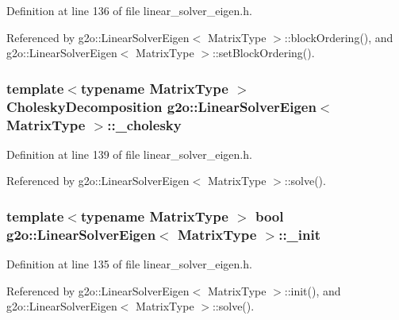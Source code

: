 Definition at line 136 of file linear\+\_\+solver\+\_\+eigen.\+h.



Referenced by g2o\+::\+Linear\+Solver\+Eigen$<$ Matrix\+Type $>$\+::block\+Ordering(), and g2o\+::\+Linear\+Solver\+Eigen$<$ Matrix\+Type $>$\+::set\+Block\+Ordering().

\subsubsection[{\texorpdfstring{\+\_\+cholesky}{_cholesky}}]{\setlength{\rightskip}{0pt plus 5cm}template$<$typename Matrix\+Type $>$ {\bf Cholesky\+Decomposition} {\bf g2o\+::\+Linear\+Solver\+Eigen}$<$ Matrix\+Type $>$\+::\+\_\+cholesky\hspace{0.3cm}{\ttfamily [protected]}}\hypertarget{classg2o_1_1LinearSolverEigen_ab7205de4c6820b3ecd7ed7f39bbdf573}{}\label{classg2o_1_1LinearSolverEigen_ab7205de4c6820b3ecd7ed7f39bbdf573}


Definition at line 139 of file linear\+\_\+solver\+\_\+eigen.\+h.



Referenced by g2o\+::\+Linear\+Solver\+Eigen$<$ Matrix\+Type $>$\+::solve().

\subsubsection[{\texorpdfstring{\+\_\+init}{_init}}]{\setlength{\rightskip}{0pt plus 5cm}template$<$typename Matrix\+Type $>$ bool {\bf g2o\+::\+Linear\+Solver\+Eigen}$<$ Matrix\+Type $>$\+::\+\_\+init\hspace{0.3cm}{\ttfamily [protected]}}\hypertarget{classg2o_1_1LinearSolverEigen_a52c02e9b24e4f6ade190e6adb29b05b4}{}\label{classg2o_1_1LinearSolverEigen_a52c02e9b24e4f6ade190e6adb29b05b4}


Definition at line 135 of file linear\+\_\+solver\+\_\+eigen.\+h.



Referenced by g2o\+::\+Linear\+Solver\+Eigen$<$ Matrix\+Type $>$\+::init(), and g2o\+::\+Linear\+Solver\+Eigen$<$ Matrix\+Type $>$\+::solve().

